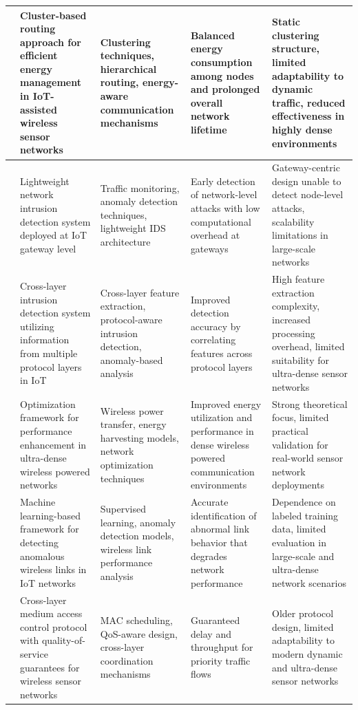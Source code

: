 \documentclass[a4paper,fleqn]{cas-dc}
\numberwithin{equation}{section}
\begin{document}
\begin{table}[htbp]
\begin{tabular}{|L{0.85cm}|L{3.4cm}|L{3.0cm}|L{3.2cm}|L{3.7cm}|}
\cite{Firdous2022} & Cluster-based routing approach for efficient energy management in IoT-assisted wireless sensor networks & Clustering techniques, hierarchical routing, energy-aware communication mechanisms & Balanced energy consumption among nodes and prolonged overall network lifetime & Static clustering structure, limited adaptability to dynamic traffic, reduced effectiveness in highly dense environments \\
\hline

\cite{Nguyen2022} & Lightweight network intrusion detection system deployed at IoT gateway level & Traffic monitoring, anomaly detection techniques, lightweight IDS architecture & Early detection of network-level attacks with low computational overhead at gateways & Gateway-centric design unable to detect node-level attacks, scalability limitations in large-scale networks \\
\hline

\cite{Kamaldeep202128066} & Cross-layer intrusion detection system utilizing information from multiple protocol layers in IoT & Cross-layer feature extraction, protocol-aware intrusion detection, anomaly-based analysis & Improved detection accuracy by correlating features across protocol layers & High feature extraction complexity, increased processing overhead, limited suitability for ultra-dense sensor networks \\
\hline

\cite{Diamantoulakis2021} & Optimization framework for performance enhancement in ultra-dense wireless powered networks & Wireless power transfer, energy harvesting models, network optimization techniques & Improved energy utilization and performance in dense wireless powered communication environments & Strong theoretical focus, limited practical validation for real-world sensor network deployments \\
\hline

\cite{Cerar2020212130} & Machine learning-based framework for detecting anomalous wireless links in IoT networks & Supervised learning, anomaly detection models, wireless link performance analysis & Accurate identification of abnormal link behavior that degrades network performance & Dependence on labeled training data, limited evaluation in large-scale and ultra-dense network scenarios \\
\hline

\cite{Ruiz2011} & Cross-layer medium access control protocol with quality-of-service guarantees for wireless sensor networks & MAC scheduling, QoS-aware design, cross-layer coordination mechanisms & Guaranteed delay and throughput for priority traffic flows & Older protocol design, limited adaptability to modern dynamic and ultra-dense sensor networks \\
\hline


\end{tabular}
\end{table}
\end{document}
